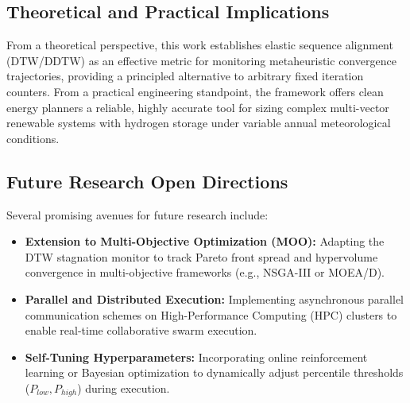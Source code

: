 \subsection{Theoretical and Practical Implications}
\label{sec:conclusions_implications}

From a theoretical perspective, this work establishes elastic sequence alignment (DTW/DDTW) as an effective metric for monitoring metaheuristic convergence trajectories, providing a principled alternative to arbitrary fixed iteration counters. From a practical engineering standpoint, the framework offers clean energy planners a reliable, highly accurate tool for sizing complex multi-vector renewable systems with hydrogen storage under variable annual meteorological conditions.

\subsection{Future Research Open Directions}
\label{sec:conclusions_future_work}

Several promising avenues for future research include:
\begin{itemize}
    \item \textbf{Extension to Multi-Objective Optimization (MOO):} Adapting the DTW stagnation monitor to track Pareto front spread and hypervolume convergence in multi-objective frameworks (e.g., NSGA-III or MOEA/D).
    \item \textbf{Parallel and Distributed Execution:} Implementing asynchronous parallel communication schemes on High-Performance Computing (HPC) clusters to enable real-time collaborative swarm execution.
    \item \textbf{Self-Tuning Hyperparameters:} Incorporating online reinforcement learning or Bayesian optimization to dynamically adjust percentile thresholds ($P_{low}, P_{high}$) during execution.
\end{itemize}
